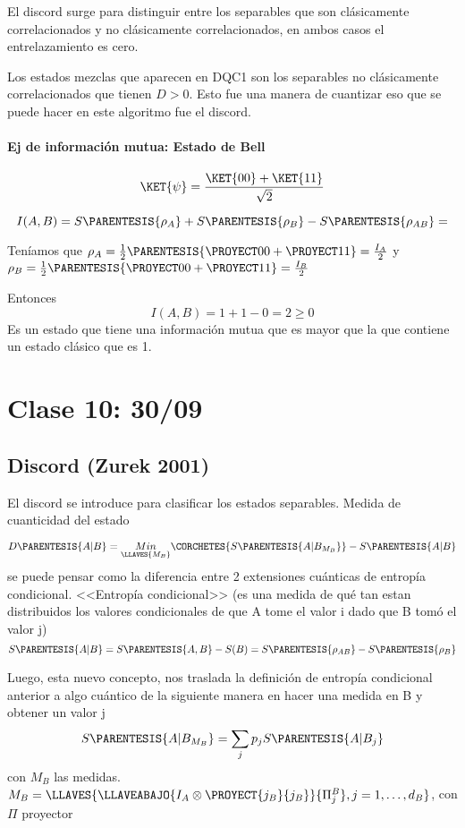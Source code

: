El discord surge para distinguir entre los separables que son clásicamente
correlacionados y no clásicamente correlacionados, en ambos casos
el entrelazamiento es cero.

Los estados mezclas que aparecen en DQC1 son los separables no clásicamente
correlacionados que tienen $D>0$. Esto fue una manera de cuantizar
eso que se puede hacer en este algoritmo fue el discord. 

\subsubsection{Ej de información mutua: Estado de Bell}

\[
\KET{\psi}=\frac{\KET{00}+\KET{11}}{\sqrt{2}}
\]

\[
I(A,B)=S\PARENTESIS{\rho_{A}}+S\PARENTESIS{\rho_{B}}-S\PARENTESIS{\rho_{AB}}=
\]

Teníamos que $\rho_{A}=\frac{1}{2}\PARENTESIS{\PROYECT 00+\PROYECT 11}=\frac{I_{A}}{2}$
y $\rho_{B}=\frac{1}{2}\PARENTESIS{\PROYECT 00+\PROYECT 11}=\frac{I_{B}}{2}$

Entonces 
\[
I(A,B)=1+1-0=2\ge0
\]
 Es un estado que tiene una información mutua que es mayor que la
que contiene un estado clásico que es 1. 

\chapter{Clase 10: 30/09}

\section{Discord (Zurek 2001)}

El discord se introduce para clasificar los estados separables. Medida
de cuanticidad del estado

\[
D\PARENTESIS{A|B}=\underset{\LLAVES{M_{B}}}{Min}\CORCHETES{S\PARENTESIS{A|B_{M_{B}}}}-S\PARENTESIS{A|B}
\]
se puede pensar como la diferencia entre 2 extensiones cuánticas de
entropía condicional. <<Entropía condicional>> (es una medida de
qué tan estan distribuidos los valores condicionales de que A tome
el valor i dado que B tomó el valor j)
\[
S\PARENTESIS{A|B}=S\PARENTESIS{A,B}-S(B)=S\PARENTESIS{\rho_{AB}}-S\PARENTESIS{\rho_{B}}
\]

Luego, esta nuevo concepto, nos traslada la definición de entropía
condicional anterior a algo cuántico de la siguiente manera en hacer
una medida en B y obtener un valor j 
\[
S\PARENTESIS{A|B_{M_{B}}}=\sum_{j}p_{j}S\PARENTESIS{A|B_{j}}
\]
con $M_{B}$ las medidas. $M_{B}=\LLAVES{\LLAVEABAJO{I_{A}\otimes\PROYECT{j_{B}}{j_{B}}}{\Pi_{j}^{B}},j=1,\dots,d_{B}}$,
con $\Pi$ proyector

